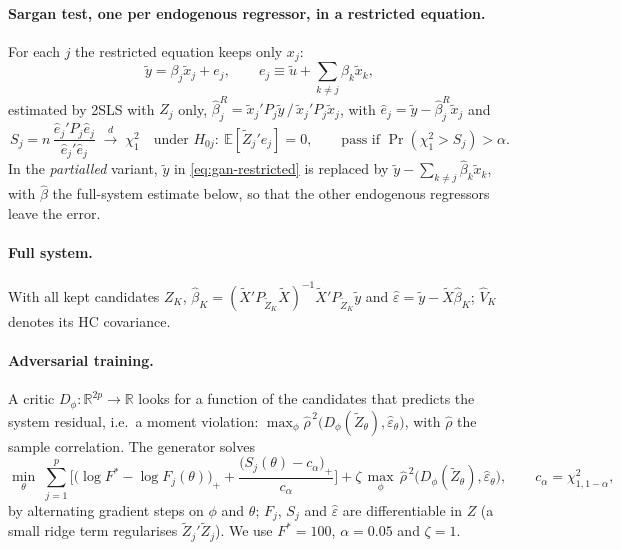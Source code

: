 \documentclass[11pt]{article}
\theoremstyle{definition}
\theoremstyle{remark}
\newcommand{\E}{\mathbb{E}}
\begin{document}
\paragraph{Sargan test, one per endogenous regressor, in a restricted equation.} For each $j$ the
restricted equation keeps only $x_j$:
\begin{equation}\label{eq:gan-restricted}
  \tilde y = \beta_j\tilde x_j + e_j,\qquad e_j \equiv \tilde u + \sum_{k\neq j}\beta_k\tilde x_k ,
\end{equation}
estimated by 2SLS with $Z_j$ only,
$\hat\beta_j^{R} = \tilde x_j'P_j\tilde y\,/\,\tilde x_j'P_j\tilde x_j$, with
$\hat e_j = \tilde y - \hat\beta_j^R\tilde x_j$ and
\begin{equation}\label{eq:gan-S}
  S_j = n\,\frac{\hat e_j'P_j\hat e_j}{\hat e_j'\hat e_j}
  \;\xrightarrow{d}\; \chi^2_1 \quad\text{under } H_{0j}:\ \E[\tilde Z_j' e_j] = 0 ,
  \qquad \text{pass if } \Pr(\chi^2_1 > S_j) > \alpha .
\end{equation}
In the \emph{partialled} variant, $\tilde y$ in \eqref{eq:gan-restricted} is replaced by
$\tilde y - \sum_{k\ne j}\hat\beta_k\tilde x_k$, with $\hat\beta$ the full-system estimate below, so
that the other endogenous regressors leave the error.

\paragraph{Full system.} With all kept candidates $Z_K$,
$\hat\beta_K = (\tilde X'P_{\tilde Z_K}\tilde X)^{-1}\tilde X'P_{\tilde Z_K}\tilde y$ and
$\hat\varepsilon = \tilde y - \tilde X\hat\beta_K$; $\hat V_K$ denotes its HC covariance.

\paragraph{Adversarial training.} A critic $D_\phi:\mathbb{R}^{2p}\to\mathbb{R}$ looks for a function
of the candidates that predicts the system residual, i.e.\ a moment violation:
$\max_\phi \hat\rho^{\,2}\big(D_\phi(\tilde Z_\theta),\hat\varepsilon_\theta\big)$, with
$\hat\rho$ the sample correlation. The generator solves
\begin{equation}\label{eq:gan-loss}
  \min_\theta\; \sum_{j=1}^p\Big[\big(\log F^\ast - \log F_j(\theta)\big)_+
     + \frac{\big(S_j(\theta)-c_\alpha\big)_+}{c_\alpha}\Big]
     + \zeta\,\max_\phi\,\hat\rho^{\,2}\big(D_\phi(\tilde Z_\theta),\hat\varepsilon_\theta\big),
  \qquad c_\alpha = \chi^2_{1,1-\alpha},
\end{equation}
by alternating gradient steps on $\phi$ and $\theta$; $F_j$, $S_j$ and $\hat\varepsilon$ are
differentiable in $Z$ (a small ridge term regularises $\tilde Z_j'\tilde Z_j$). We use
$F^\ast=100$, $\alpha=0.05$ and $\zeta=1$.
\end{document}
